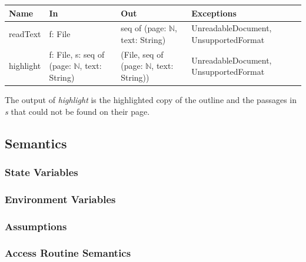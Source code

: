 \documentclass[12pt, titlepage]{article}
\begin{document}
\begin{center}\small
\begin{tabular}{>{\raggedright\arraybackslash}p{2.2cm} >{\raggedright\arraybackslash}p{4.2cm} >{\raggedright\arraybackslash}p{4.3cm} >{\raggedright\arraybackslash}p{3.9cm}}
\hline
\textbf{Name} & \textbf{In} & \textbf{Out} & \textbf{Exceptions} \\
\hline
readText & f: File & seq of (page: $\mathbb{N}$, text: String) & UnreadableDocument, UnsupportedFormat \\
highlight & f: File, s: seq of (page: $\mathbb{N}$, text: String) & (File, seq of (page: $\mathbb{N}$, text: String)) & UnreadableDocument, UnsupportedFormat \\
\hline
\end{tabular}
\end{center}

\noindent The output of \textit{highlight} is the highlighted copy of the
outline and the passages in \textit{s} that could not be found on their page.

\subsection{Semantics}

\subsubsection{State Variables}


\subsubsection{Environment Variables}


\subsubsection{Assumptions}

\subsubsection{Access Routine Semantics}
\end{document}
